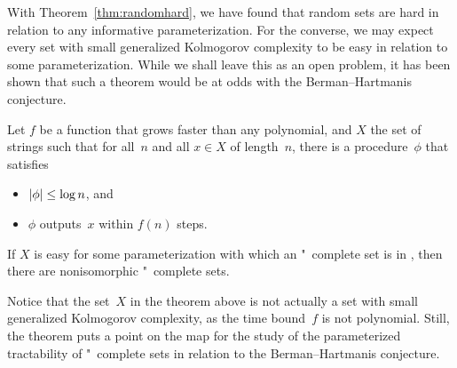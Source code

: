 With Theorem~\ref{thm:randomhard}, we have found that random sets are hard in relation to any informative parameterization.
For the converse, we may expect every set with small generalized Kolmogorov complexity to be easy in relation to some parameterization.
While we shall leave this as an open problem, it has been shown that such a theorem would be at odds with the Berman--Hartmanis conjecture.
\begin{theorem}
  Let $f$ be a function that grows faster than any polynomial, and $X$ the set of strings such that for all~$n$ and all $x \in X$ of length~$n$, there is a procedure~$\phi$ that satisfies
  \begin{itemize}
  \item ${\lvert\phi\rvert} \le \log n$, and
  \item $\phi$ outputs~$x$ within $f(n)$ steps.
  \end{itemize}
  If $X$ is easy for some parameterization with which an "~complete set is in , then there are nonisomorphic "~complete sets.
\end{theorem}

Notice that the set~$X$ in the theorem above is not actually a set with small generalized Kolmogorov complexity, as the time bound~$f$ is not polynomial.
Still, the theorem puts a point on the map for the study of the parameterized tractability of "~complete sets in relation to the Berman--Hartmanis conjecture.

